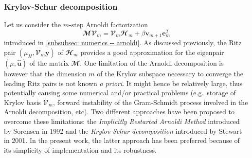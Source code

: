     \subsubsection{Krylov-Schur decomposition}

    Let us consider the $m$-step Arnoldi factorization
    \begin{equation}
      \mathbfcal{MV}_m = \mathbfcal{V}_m \mathbfcal{H}_m + \beta \mathbf{v}_{m+1} \mathbf{e}^T_m
      \label{eq: m-step Arnoldi}
    \end{equation}
    introduced in \textsection \ref{subsubsec: numerics -- arnoldi}. As discussed previously, the Ritz pair $\left( \mu_H, \mathbfcal{V}_m \mathbf{y} \right)$ of $\mathbfcal{H}_m$ provides a good approximation for the eigenpair $\left( \mu, \hat{\mathbf u} \right)$ of the matrix $\mathbfcal{M}$. One limitation of the Arnoldi decomposition is however that the dimension $m$ of the Krylov subspace necessary to converge the leading Ritz pairs is not known \emph{a priori}. It might hence be relatively large, thus potentially causing some numerical and/or practical problems (e.g.\ storage of Krylov basis $\mathbfcal{V}_m$, forward instability of the Gram-Schmidt process involved in the Arnoldi decomposition, etc). Two different approaches have been proposed to overcome these limitations: the \emph{Implicitly Restarted Arnoldi Method} introduced by Sorensen \cite{Sorensen_SIAM_1992} in 1992 and the \emph{Krylov-Schur decomposition} introduced by Stewart \cite{Stewart_SIAM_2001} in 2001. In the present work, the latter approach has been preferred because of its simplicity of implementation and its robustness.

